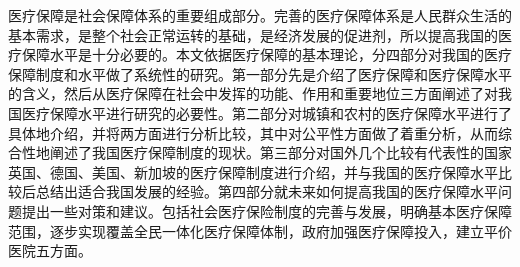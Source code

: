 
{ %

医疗保障是社会保障体系的重要组成部分。完善的医疗保障体系是人民群众生活的基本需求，是整个社会正常运转的基础，是经济发展的促进剂，所以提高我国的医疗保障水平是十分必要的。本文依据医疗保障的基本理论，分四部分对我国的医疗保障制度和水平做了系统性的研究。第一部分先是介绍了医疗保障和医疗保障水平的含义，然后从医疗保障在社会中发挥的功能、作用和重要地位三方面阐述了对我国医疗保障水平进行研究的必要性。第二部分对城镇和农村的医疗保障水平进行了具体地介绍，并将两方面进行分析比较，其中对公平性方面做了着重分析，从而综合性地阐述了我国医疗保障制度的现状。第三部分对国外几个比较有代表性的国家英国、德国、美国、新加坡的医疗保障制度进行介绍，并与我国的医疗保障水平比较后总结出适合我国发展的经验。第四部分就未来如何提高我国的医疗保障水平问题提出一些对策和建议。包括社会医疗保险制度的完善与发展，明确基本医疗保障范围，逐步实现覆盖全民一体化医疗保障体制，政府加强医疗保障投入，建立平价医院五方面。


}

